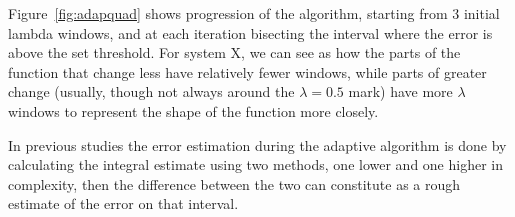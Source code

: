 Figure~\ref{fig:adapquad}  shows progression of the algorithm,
starting from 3 initial lambda windows, and at each iteration bisecting the
interval where the error is above the set threshold. For system X, we can see
as how the parts of the function that change less have relatively fewer
windows, while parts of greater change (usually, though not always around the
$\lambda=0.5$ mark) have more $\lambda$ windows to represent the shape of the
function more closely.

 In previous studies \cite{} the
error estimation during the adaptive algorithm is done by calculating the
integral estimate using two methods, one lower and one higher in complexity,
then the difference between the two can constitute as a rough estimate of the
error on that interval.

